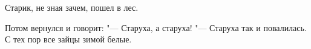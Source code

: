 Старик, не зная зачем, пошел в лес.

    Потом вернулся и говорит: "--- Старуха,  а старуха!   "---   Старуха так и повалилась.  С тех пор
все зайцы зимой белые.

